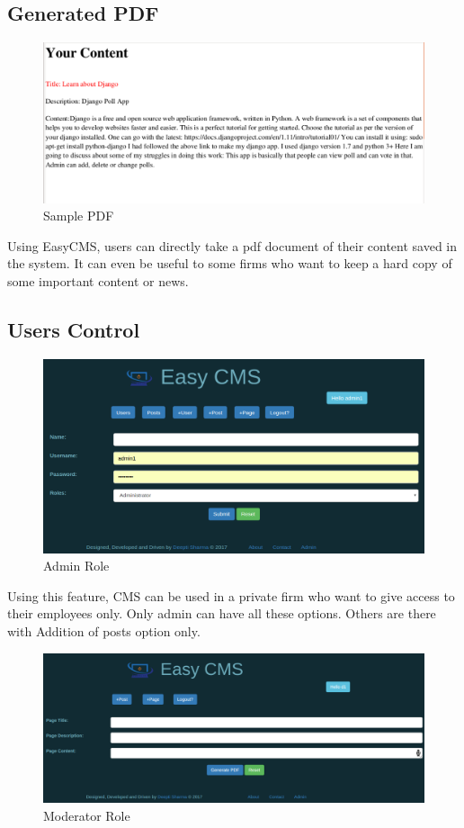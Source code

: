 \subsection{Generated PDF}
\begin{figure}[h!]
	\centering \includegraphics[scale=.47]{input/images/demo.pdf}
	\caption{Sample PDF}
\end{figure}

Using EasyCMS, users can directly take a pdf document of their content saved in the system. It can even be useful to some firms who want to keep a hard copy of some important content or news.


\subsection{Users Control}
\begin{figure}[h!]
	\centering \includegraphics[scale=.45]{input/images/easy4.png}
	\caption{Admin Role}
\end{figure}

Using this feature, CMS can be used in a private firm who want to give access to their employees only.
Only admin can have all these options. Others are there with Addition of posts option only.\\

\begin{figure}[h!]
	\centering \includegraphics[scale=.40]{input/images/mode.png}
	\caption{Moderator Role}
\end{figure}
\newpage

